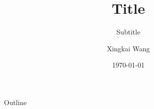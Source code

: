 \documentclass[10pt,aspectratio=169,mathserif]{beamer}
\title{Title}
\subtitle{Subtitle}
\author{Xingkai Wang}
\institute{Zhejiang University}
\date{\today{}}
\newcommand{\code}[1]{\texttt{{\detokenize{#1}}}}
\begin{document}
\begin{frame}
	\titlepage
\end{frame}

\begin{frame}{Outline}
	\tableofcontents
\end{frame}





\end{document}
